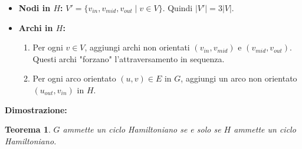 \documentclass[a4paper]{article}
\newtheorem{theorem}{Teorema}
\begin{document}
\begin{itemize}
    \item \textbf{Nodi in $H$:} $V' = \{v_{in}, v_{mid}, v_{out} \mid v \in V\}$. Quindi $|V'| = 3|V|$.
    \item \textbf{Archi in $H$:}
    \begin{enumerate}
        \item Per ogni $v \in V$, aggiungi archi non orientati $(v_{in}, v_{mid})$ e $(v_{mid}, v_{out})$. Questi archi "forzano" l'attraversamento in sequenza.
        \item Per ogni arco orientato $(u, v) \in E$ in $G$, aggiungi un arco non orientato $(u_{out}, v_{in})$ in $H$.
    \end{enumerate}
\end{itemize}

\textbf{Dimostrazione:}
\begin{theorem}
$G$ ammette un ciclo Hamiltoniano se e solo se $H$ ammette un ciclo Hamiltoniano.
\end{theorem}
\end{document}
